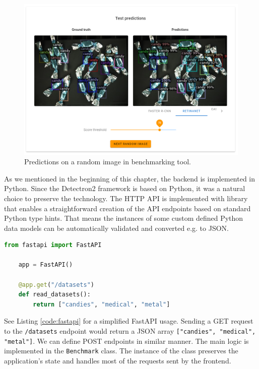 \begin{figure}[ht]
    \includegraphics[width=\linewidth]{Sources/Figures/eval_random_image_.png}
    \caption{Predictions on a random image in benchmarking tool.}
    \label{fig:random-inference}
\end{figure}

As we mentioned in the beginning of this chapter, the backend is implemented in
Python. Since the Detectron2 framework is based on Python, it was a natural
choice to preserve the technology. The HTTP API is implemented with
 library that enables a straightforward creation of the API
endpoints based on standard Python type hints. That means the instances of some
custom defined Python data models can be automatically validated and converted
e.g. to JSON.

\begin{lstlisting}[language=python, caption=Simplified FastAPI example]
    from fastapi import FastAPI

    app = FastAPI()

    @app.get("/datasets")
    def read_datasets():
        return ["candies", "medical", "metal"]
\end{lstlisting}
\label{code:fastapi}

See Listing \ref{code:fastapi} for a simplified FastAPI usage.
Sending a GET request to the \texttt{/datasets} endpoint would return a JSON
array \texttt{["candies", "medical", "metal"]}. We can define POST endpoints in
similar manner. The main logic is implemented in the \texttt{Benchmark} class.
The instance of the class preserves the application's state and handles most of
the requests sent by the frontend.

